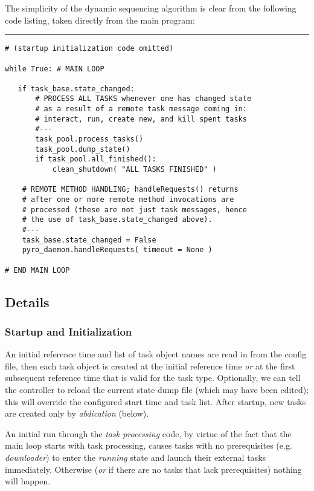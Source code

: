 \documentclass[11pt,a4paper]{article}
\begin{document}
The simplicity of the dynamic sequencing algorithm is clear from the
following code listing, taken directly from the main program:

{\small
\noindent
\rule{5cm}{.2mm}
\begin{lstlisting}
# (startup initialization code omitted)

while True: # MAIN LOOP

   if task_base.state_changed:
       # PROCESS ALL TASKS whenever one has changed state
       # as a result of a remote task message coming in: 
       # interact, run, create new, and kill spent tasks
       #---
       task_pool.process_tasks()
       task_pool.dump_state()
       if task_pool.all_finished():
           clean_shutdown( "ALL TASKS FINISHED" )

    # REMOTE METHOD HANDLING; handleRequests() returns 
    # after one or more remote method invocations are 
    # processed (these are not just task messages, hence 
    # the use of task_base.state_changed above).
    #---
    task_base.state_changed = False
    pyro_daemon.handleRequests( timeout = None )

# END MAIN LOOP
\end{lstlisting}
}

\subsection{Details}

\subsubsection{Startup and Initialization}

An initial reference time and list of task object names are read in from
the config file, then each task object is created at the initial
reference time {\em or} at the first subsequent reference time that is
valid for the task type. Optionally, we can tell the controller to
reload the current state dump file (which may have been edited); this
will override the configured start time and task list. After startup,
new tasks are created only by {\em abdication} (below).

An initial run through the {\em task processing} code, by virtue of the
fact that the main loop starts with task processing, causes tasks with
no prerequisites (e.g. {\em downloader}) to enter the {\em running}
state and launch their external tasks immediately. Otherwise ({\em or}
if there are no tasks that lack prerequisites) nothing will happen.
\end{document}
